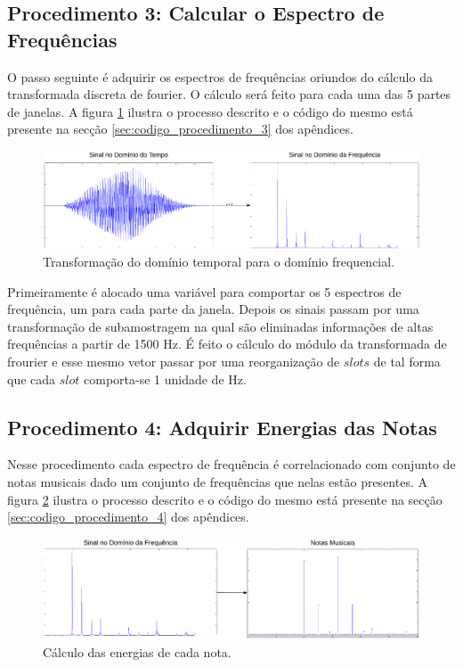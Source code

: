 \subsection{Procedimento 3: Calcular o Espectro de Frequências}
\label{subsec:procedimento_3}

O passo seguinte é adquirir os espectros de frequências oriundos do cálculo da transformada discreta de fourier. O cálculo será feito para cada uma das 5 partes de janelas. A figura \ref{fig:procedimento_3} ilustra o processo descrito e o código do mesmo está presente na secção \ref{sec:codigo_procedimento_3} dos apêndices.

\begin{figure}[h] 
  \centering
    \includegraphics[keepaspectratio=true, scale=0.5]{figuras/procedimento_3}
    \caption{Transformação do domínio temporal para o domínio frequencial.}
    \label{fig:procedimento_3}
\end{figure}

Primeiramente é alocado uma variável para comportar os 5 espectros de frequência, um para cada parte da janela. Depois os sinais passam por uma transformação de subamostragem na qual são eliminadas informações de altas frequências a partir de 1500 Hz. É feito o cálculo do módulo da transformada de frourier e esse mesmo vetor passar por uma reorganização de $slots$ de tal forma que cada $slot$ comporta-se 1 unidade de Hz.

\subsection{Procedimento 4: Adquirir Energias das Notas}
\label{subsec:procedimento_4}

Nesse procedimento cada espectro de frequência é correlacionado com conjunto de notas musicais dado um conjunto de frequências que nelas estão presentes. A figura \ref{fig:procedimento_4} ilustra o processo descrito e o código do mesmo está presente na secção \ref{sec:codigo_procedimento_4} dos apêndices.

\begin{figure}[h] 
  \centering
    \includegraphics[keepaspectratio=true, scale=0.55]{figuras/procedimento_4}
    \caption{Cálculo das energias de cada nota.}
    \label{fig:procedimento_4}
\end{figure}

